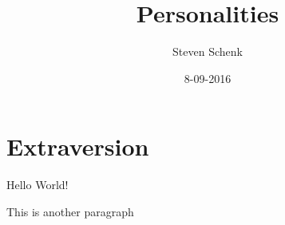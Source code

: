 \documentclass{article}
\title{Personalities}
\date{8-09-2016}
\author{Steven Schenk}
\begin{document}
  \maketitle
  \newpage
  \tableofcontents

  \newpage
  \section{Extraversion}
  Hello World!

  This is another paragraph
\end{document}
